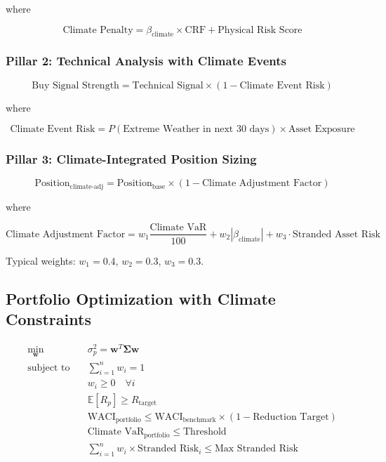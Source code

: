 \documentclass[11pt,a4paper]{article}
\begin{document}
where

\begin{equation}
\text{Climate Penalty} = \beta_{\text{climate}} \times \text{CRF} + \text{Physical Risk Score}
\end{equation}

\subsubsection{Pillar 2: Technical Analysis with Climate Events}

\begin{equation}
\text{Buy Signal Strength} = \text{Technical Signal} \times (1 - \text{Climate Event Risk})
\end{equation}

where

\begin{equation}
\text{Climate Event Risk} = P(\text{Extreme Weather in next 30 days}) \times \text{Asset Exposure}
\end{equation}

\subsubsection{Pillar 3: Climate-Integrated Position Sizing}

\begin{equation}
\text{Position}_{\text{climate-adj}} = \text{Position}_{\text{base}} \times (1 - \text{Climate Adjustment Factor})
\end{equation}

where

\begin{equation}
\text{Climate Adjustment Factor} = w_1 \frac{\text{Climate VaR}}{100} + w_2 |\beta_{\text{climate}}| + w_3 \cdot \text{Stranded Asset Risk}
\end{equation}

Typical weights: $w_1 = 0.4$, $w_2 = 0.3$, $w_3 = 0.3$.

\subsection{Portfolio Optimization with Climate Constraints}

\begin{align}
\min_{\mathbf{w}} \quad & \sigma_p^2 = \mathbf{w}^T \boldsymbol{\Sigma} \mathbf{w}\\
\text{subject to} \quad & \sum_{i=1}^{n} w_i = 1\\
& w_i \geq 0 \quad \forall i\\
& \mathbb{E}[R_p] \geq R_{\text{target}}\\
& \text{WACI}_{\text{portfolio}} \leq \text{WACI}_{\text{benchmark}} \times (1 - \text{Reduction Target})\\
& \text{Climate VaR}_{\text{portfolio}} \leq \text{Threshold}\\
& \sum_{i=1}^{n} w_i \times \text{Stranded Risk}_i \leq \text{Max Stranded Risk}
\end{align}
\end{document}
